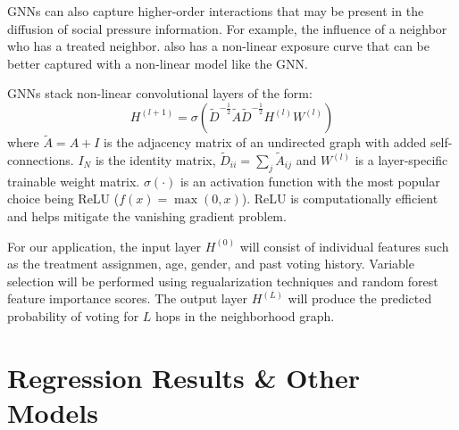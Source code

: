 \documentclass[11pt, draft]{article}
\begin{document}
GNNs can also capture higher-order interactions that may be present in the diffusion of social pressure information. For example, the influence of a neighbor who has a treated neighbor. \cite{myers_information_2012} also has a non-linear exposure curve that can be better captured with a non-linear model like the GNN.

GNNs stack non-linear convolutional layers of the form:
\begin{equation*}
    H^{(l+1)} = \sigma(\tilde{D}^{-\frac{1}{2}}\tilde{A}\tilde{D}^{-\frac{1}{2}}H^{(l)}W^{(l)})
\end{equation*}
where $\tilde{A} = A + I$ is the adjacency matrix of an undirected graph with added self-connections. $I_N$ is the identity matrix, $\tilde{D}_{ii} = \sum_j \tilde{A}_{ij}$ and $W^{(l)}$ is a layer-specific trainable weight matrix. $\sigma(\cdot)$ is an activation function with the most popular choice being ReLU ($f(x) = \max(0,x)$). ReLU is computationally efficient and helps mitigate the vanishing gradient problem.

For our application, the input layer $H^{(0)}$ will consist of individual features such as the treatment assignmen, age, gender, and past voting history. Variable selection will be performed using regualarization techniques and random forest feature importance scores. The output layer $H^{(L)}$ will produce the predicted probability of voting for $L$ hops in the neighborhood graph.

\section{Regression Results \& Other Models}
\end{document}
